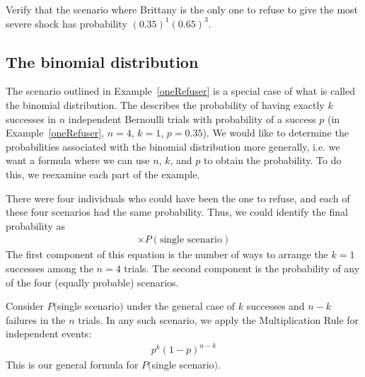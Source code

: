 \begin{exercisewrap}
\begin{nexercise}
Verify that the scenario where Brittany is the only one to refuse to give the most severe shock has probability $(0.35)^1(0.65)^3$.~\footnotemark
\end{nexercise}
\end{exercisewrap}


\subsection{The binomial distribution}

The scenario outlined in Example~\ref{oneRefuser} is a special case of what is called the binomial distribution. The  describes the probability of having exactly $k$ successes in $n$ independent Bernoulli trials with probability of a success $p$  (in Example~\ref{oneRefuser}, $n=4$, $k=1$, $p=0.35$). We would like to determine the probabilities associated with the binomial distribution more generally, i.e. we want a formula where we can use $n$, $k$, and $p$ to obtain the probability. To do this, we reexamine each part of the example.

There were four individuals who could have been the one to refuse, and each of these four scenarios had the same probability. Thus, we could identify the final probability as
\begin{align*}
[\text{\# of scenarios}] \times P(\text{single scenario})
\end{align*}
The first component of this equation is the number of ways to arrange the $k=1$ successes among the $n=4$ trials. The second component is the probability of any of the four (equally probable) scenarios.

Consider $P($single scenario$)$ under the general case of $k$ successes and $n-k$ failures in the $n$ trials. In any such scenario, we apply the Multiplication Rule for independent events:
\begin{align*}
p^k(1-p)^{n-k}
\end{align*}
This is our general formula for $P($single scenario$)$.

